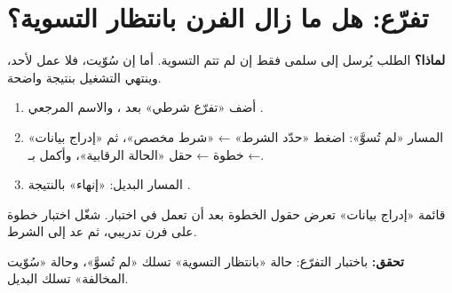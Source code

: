 \section{تفرّع: هل ما زال الفرن بانتظار التسوية؟}
\label{sec:real-branch}
\textbf{لماذا؟} الطلب يُرسل إلى سلمى فقط إن لم تتم التسوية. أما إن سُوّيت، فلا عمل لأحد، وينتهي التشغيل بنتيجة واضحة.
\begin{enumerate}
\item أضف «تفرّع شرطي» بعد ، والاسم المرجعي .
\item المسار «لم تُسوَّ»: اضغط «حدّد الشرط» ← «شرط مخصص»، ثم «إدراج بيانات» ← خطوة  ← حقل «الحالة الرقابية»، وأكمل بـ.
\item المسار البديل: «إنهاء» بالنتيجة .
\end{enumerate}
\begin{rcnote}
قائمة «إدراج بيانات» تعرض حقول الخطوة بعد أن تعمل في اختبار. شغّل اختبار خطوة  على فرن تدريبي، ثم عد إلى الشرط.
\end{rcnote}
\textbf{تحقق:} باختبار التفرّع: حالة «بانتظار التسوية» تسلك «لم تُسوَّ»، وحالة «سُوّيت المخالفة» تسلك البديل.

